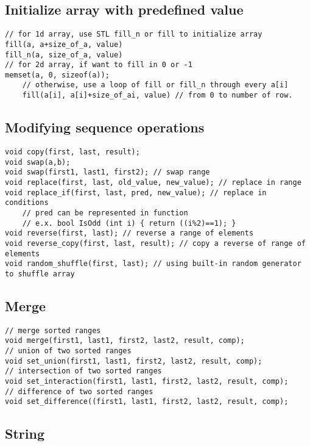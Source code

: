 \documentclass[a4paper]{article}
\begin{document}
\subsection{Initialize array with predefined value}
\begin{verbatim}
// for 1d array, use STL fill_n or fill to initialize array
fill(a, a+size_of_a, value)
fill_n(a, size_of_a, value)
// for 2d array, if want to fill in 0 or -1
memset(a, 0, sizeof(a));
	// otherwise, use a loop of fill or fill_n through every a[i]
	fill(a[i], a[i]+size_of_ai, value) // from 0 to number of row.
\end{verbatim}

\subsection{Modifying sequence operations}

\begin{verbatim}
void copy(first, last, result);
void swap(a,b);
void swap(first1, last1, first2); // swap range
void replace(first, last, old_value, new_value); // replace in range
void replace_if(first, last, pred, new_value); // replace in conditions
	// pred can be represented in function
	// e.x. bool IsOdd (int i) { return ((i%2)==1); }
void reverse(first, last); // reverse a range of elements
void reverse_copy(first, last, result); // copy a reverse of range of elements
void random_shuffle(first, last); // using built-in random generator to shuffle array
\end{verbatim}

\subsection{Merge}

\begin{verbatim}
// merge sorted ranges
void merge(first1, last1, first2, last2, result, comp);
// union of two sorted ranges
void set_union(first1, last1, first2, last2, result, comp);
// intersection of two sorted ranges
void set_interaction(first1, last1, first2, last2, result, comp);
// difference of two sorted ranges
void set_difference((first1, last1, first2, last2, result, comp);
\end{verbatim}

\subsection{String}
\end{document}
